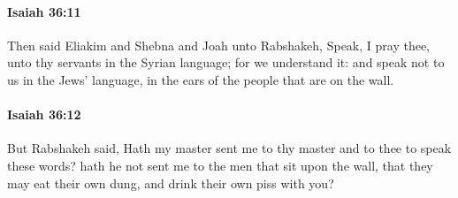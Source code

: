 		\paragraph{Isaiah 36:11} %
			\label{ISAIAH-36-11}

			Then said Eliakim and Shebna and Joah unto Rabshakeh, Speak, I pray thee, unto thy servants in the Syrian language; for we understand it: and speak not to us in the Jews' language, in the ears of the people that are on the wall.


		\paragraph{Isaiah 36:12} %
			\label{ISAIAH-36-12}

			But Rabshakeh said, Hath my master sent me to thy master and to thee to speak these words? hath he not sent me to the men that sit upon the wall, that they may eat their own dung, and drink their own piss with you?

